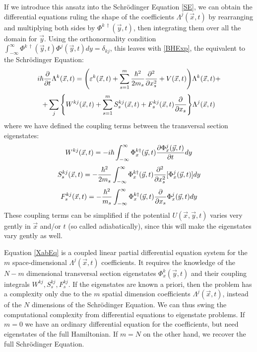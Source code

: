 \documentclass[11pt, a4paper]{article} %
\begin{document}
If we introduce this ansatz into the Schrödinger Equation \eqref{SE}, we can obtain the differential equations ruling the shape of the coefficients $\Lambda^j(\vec{x},t)$ by rearranging and multiplying both sides by $\Phi^{k\ \dagger}(\vec{y},t)$, then integrating them over all the domain for $\vec{y}$. Using the orthonormality condition $\int_{-\infty}^{\infty}\Phi^{k\ \dagger}(\vec{y},t) \Phi^{j}(\vec{y},t) dy= \delta_{kj}$, this leaves with \eqref{BHExp}, the equivalent to the Schrödinger Equation:\vspace{-0.1cm}
\begin{equation}\label{XabEq}
i\hbar \pdv{}{t}\Lambda^k(\vec{x},t) = \qty( \varepsilon^k(\vec{x},t) + \sum_{s=1}^m\frac{\hbar^2}{2m_s}\pdv[2]{}{x_s}+V(\vec{x},t))\Lambda^k(\vec{x},t)+
\end{equation}
$$
 +\sum_j \qty{ W^{kj}(\vec{x},t) + \sum_{s=1}^m S^{kj}_s(\vec{x},t)+F^{kj}_s(\vec{x},t)\pdv{}{x_s} } \Lambda^j(\vec{x},t) 
$$
where we have defined the coupling terms between the transversal section eigenstates:
\begin{equation}
W^{kj}(\vec{x},t) = -i\hbar\int_{-\infty}^{\infty}\Phi_x^{k\dagger}(\vec{y},t) \pdv{\Phi^j_x(\vec{y},t)}{t} dy
\end{equation}
\begin{equation}\label{S}
S^{kj}_s(\vec{x},t) = -\frac{\hbar^2}{2m_s}\int_{-\infty}^{\infty}\Phi_x^{k\dagger}(\vec{y},t) \pdv[2]{}{x_s} [\Phi^j_x(\vec{y},t)] dy
\end{equation}
\begin{equation}\label{F}
F^{kj}_s(\vec{x},t) = -\frac{\hbar^2}{m_s}\int_{-\infty}^{\infty}\Phi_x^{k\dagger}(\vec{y},t) \pdv{}{x_s}\Phi^j_x(\vec{y},t) dy
\end{equation}
These coupling terms can be simplified if the potential $U(\vec{x},\vec{y},t)$ varies very gently in $\vec{x}$ and/or $t$ (so called adiabatically), since this will make the eigenstates vary gently as well.

Equation \eqref{XabEq} is a coupled linear partial differential equation system for the $m$ space-dimensional $\Lambda^j(\vec{x},t)$ coefficients. It requires the knowledge of the $N-m$ dimensional transversal section eigenstates $\Phi^k_x(\vec{y},t)$ and their coupling integrals $W^{kj}, S^{kj}_s, F^{kj}_s$.  If the eigenstates are known a priori, then the problem has a complexity only due to the $m$ spatial dimension coefficients $\Lambda^j(\vec{x},t)$, instead of the $N$ dimensions of the Schrödinger Equation. We can thus swing the computational complexity from differential equations to eigenstate problems. If $m=0$ we have an ordinary differential equation for the coefficients, but need eigenstates of the full Hamiltonian. If $m=N$ on the other hand, we recover the full Schrödinger Equation.
\vspace{-0.3cm}
\end{document}
